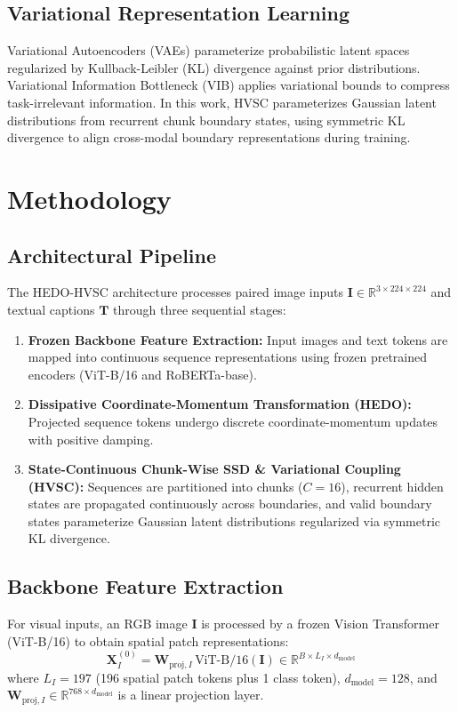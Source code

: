 \documentclass[journal]{IEEEtran}
\begin{document}
\subsection{Variational Representation Learning}
Variational Autoencoders (VAEs) \cite{kingma2013auto} parameterize probabilistic latent spaces regularized by Kullback-Leibler (KL) divergence against prior distributions. Variational Information Bottleneck (VIB) \cite{alemi2016deep} applies variational bounds to compress task-irrelevant information. In this work, HVSC parameterizes Gaussian latent distributions from recurrent chunk boundary states, using symmetric KL divergence to align cross-modal boundary representations during training.

\section{Methodology}
\label{sec:methodology}

\subsection{Architectural Pipeline}
The HEDO-HVSC architecture processes paired image inputs $\mathbf{I} \in \mathbb{R}^{3 \times 224 \times 224}$ and textual captions $\mathbf{T}$ through three sequential stages:
\begin{enumerate}
    \item \textbf{Frozen Backbone Feature Extraction:} Input images and text tokens are mapped into continuous sequence representations using frozen pretrained encoders (ViT-B/16 and RoBERTa-base).
    \item \textbf{Dissipative Coordinate-Momentum Transformation (HEDO):} Projected sequence tokens undergo discrete coordinate-momentum updates with positive damping.
    \item \textbf{State-Continuous Chunk-Wise SSD \& Variational Coupling (HVSC):} Sequences are partitioned into chunks ($C=16$), recurrent hidden states are propagated continuously across boundaries, and valid boundary states parameterize Gaussian latent distributions regularized via symmetric KL divergence.
\end{enumerate}

\subsection{Backbone Feature Extraction}
For visual inputs, an RGB image $\mathbf{I}$ is processed by a frozen Vision Transformer (ViT-B/16) to obtain spatial patch representations:
\begin{equation}
\mathbf{X}_I^{(0)} = \mathbf{W}_{\text{proj}, I} \, \text{ViT-B/16}(\mathbf{I}) \in \mathbb{R}^{B \times L_I \times d_{\text{model}}}
\end{equation}
where $L_I = 197$ (196 spatial patch tokens plus 1 class token), $d_{\text{model}} = 128$, and $\mathbf{W}_{\text{proj}, I} \in \mathbb{R}^{768 \times d_{\text{model}}}$ is a linear projection layer.
\end{document}
